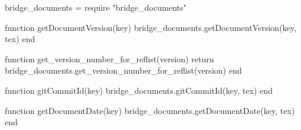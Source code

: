 \begin{luacode}

  bridge_documents = require "bridge_documents"

  function getDocumentVersion(key)
    bridge_documents.getDocumentVersion(key, tex)
  end

  function get_version_number_for_reflist(version)
   return bridge_documents.get_version_number_for_reflist(version)
  end

  function gitCommitId(key)
    bridge_documents.gitCommitId(key, tex)
  end

  function getDocumentDate(key)
    bridge_documents.getDocumentDate(key, tex)
  end

\end{luacode}
